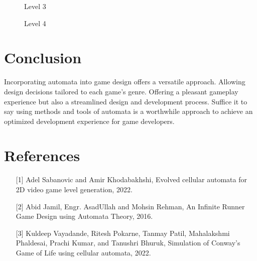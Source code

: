 \documentclass[10pt,twocolumn]{article}
\begin{document}
\begin{figure*}[t]
  \centering
  
  \caption{Level 3}
\end{figure*}

\begin{figure*}[t]
  \centering
  
  \caption{Level 4}
\end{figure*}

\clearpage

\section*{Conclusion}
Incorporating automata into game design offers a versatile approach. Allowing design decisions tailored to each game's genre. Offering a pleasant gameplay experience but also a streamlined design and development process. Suffice it to say using methods and tools of automata is a worthwhile approach to achieve an optimized development experience for game developers.

\section*{\small References}
\begin{enumerate}
    \item [{[1]}] Adel Sabanovic and Amir Khodabakhshi, Evolved cellular automata for 2D video game level generation, 2022.
    \item [{[2]}] Abid Jamil, Engr. AsadUllah and Mohsin Rehman, An Infinite Runner Game Design using Automata Theory, 2016.
    \item [{[3]}] Kuldeep Vayadande, Ritesh Pokarne, Tanmay Patil, Mahalakshmi Phaldesai, Prachi Kumar, and Tanushri Bhuruk, Simulation of Conway's Game of Life using cellular automata, 2022.
\end{enumerate}
\end{document}
